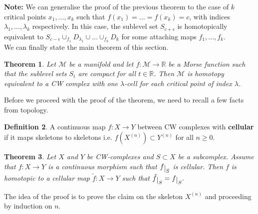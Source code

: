 \documentclass[10pt]{article}
\theoremstyle{plain}
\newtheorem{thm}{Theorem}[section] %
\theoremstyle{definition}
\newtheorem{defn}[thm]{Definition} %
\newcommand{\Note}{\textbf{Note: }}
\newcommand{\Real}{\mathbb{R}}
\newcommand{\man}{\mathcal{M}}
\def\restrict#1{\raise-.5ex\hbox{\ensuremath|}_{#1}}
\newcommand{\mysection}[1]{
    \setcounter{thm}{0}
    \section*{#1}
    \addcontentsline{toc}{section}{#1}
    \addtocounter{section}{1}
    \setcounter{subsection}{0}

}
\begin{document}
\Note We can generalise the proof of the previous theorem to the case of $k$ critical points $x_1,\ldots,x_k$ such that $f(x_1) = \dots = f(x_k) = c$, with indices $\lambda_1,\ldots,\lambda_k$ respectively. In this case, the sublevel set $S_{c+\epsilon}$ is homotopically equivalent to $S_{c-\epsilon} \cup _{f_1} D_{\lambda_1} \cup \ldots \cup_{f_k} D_k$ for some attaching maps $f_1, \ldots,f_k$.\\
We can finally state the main theorem of this section.

\begin{thm}\label{thm:MorseCompactSubleveSetsHomotopyEquivalentToCWComplex}
    Let $\man$ be a manifold and let $f:\man \to \Real$ be a Morse function such that the sublevel sets $S_t$ are compact for all $t \in \Real$. Then $\man$ is homotopy equivalent to a CW complex with one $\lambda$-cell for each critical point of index $\lambda$. 
\end{thm}
Before we proceed with the proof of the theorem, we need to recall a few facts from topology.
\begin{defn}
    A continuous map $f:X \to Y$ between CW complexes with \textbf{cellular} if it maps skeletons to skeletons i.e. $f(X^{(n)}) \subset Y^{(n)}$ for all $n\geq 0.$
\end{defn}

\begin{thm}
    Let $X$ and $Y$ be CW-complexes and $S\subset X$ be a subcomplex. Assume that $f: X \to Y$ is a continuous morphism such that $f\restrict{S}$ is cellular. Then $f$ is homotopic to a cellular map $\tilde{f} : X \to Y$ such that $\tilde{f}\restrict{S} = f\restrict{S}.$
\end{thm}

The idea of the proof is to prove the claim on the skeleton $X^{(n)}$ and proceeding by induction on $n$.
\end{document}
